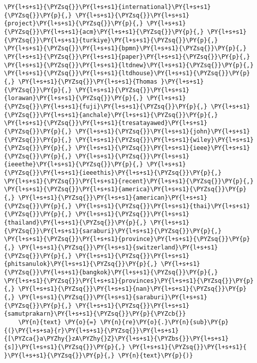 \documentclass[../main.tex]{subfiles}
\begin{document}
\begin{tcolorbox}[breakable, size=fbox, boxrule=1pt, pad at break*=1mm,colback=cellbackground, colframe=cellborder]
\begin{Verbatim}[commandchars=\\\{\}]
          \PY{l+s+s1}{\PYZsq{}}\PY{l+s+s1}{international}\PY{l+s+s1}{\PYZsq{}}\PY{p}{,} \PY{l+s+s1}{\PYZsq{}}\PY{l+s+s1}{project}\PY{l+s+s1}{\PYZsq{}}\PY{p}{,} \PY{l+s+s1}{\PYZsq{}}\PY{l+s+s1}{acm}\PY{l+s+s1}{\PYZsq{}}\PY{p}{,} \PY{l+s+s1}{\PYZsq{}}\PY{l+s+s1}{turkiye}\PY{l+s+s1}{\PYZsq{}}\PY{p}{,}  \PY{l+s+s1}{\PYZsq{}}\PY{l+s+s1}{bpmn}\PY{l+s+s1}{\PYZsq{}}\PY{p}{,} \PY{l+s+s1}{\PYZsq{}}\PY{l+s+s1}{paper}\PY{l+s+s1}{\PYZsq{}}\PY{p}{,} \PY{l+s+s1}{\PYZsq{}}\PY{l+s+s1}{ltdnew}\PY{l+s+s1}{\PYZsq{}}\PY{p}{,} \PY{l+s+s1}{\PYZsq{}}\PY{l+s+s1}{ltdhouse}\PY{l+s+s1}{\PYZsq{}}\PY{p}{,} \PY{l+s+s1}{\PYZsq{}}\PY{l+s+s1}{Thomas }\PY{l+s+s1}{\PYZsq{}}\PY{p}{,} \PY{l+s+s1}{\PYZsq{}}\PY{l+s+s1}{lorawan}\PY{l+s+s1}{\PYZsq{}}\PY{p}{,} \PY{l+s+s1}{\PYZsq{}}\PY{l+s+s1}{fuji}\PY{l+s+s1}{\PYZsq{}}\PY{p}{,} \PY{l+s+s1}{\PYZsq{}}\PY{l+s+s1}{anchale}\PY{l+s+s1}{\PYZsq{}}\PY{p}{,} \PY{l+s+s1}{\PYZsq{}}\PY{l+s+s1}{tresatayawed}\PY{l+s+s1}{\PYZsq{}}\PY{p}{,} \PY{l+s+s1}{\PYZsq{}}\PY{l+s+s1}{john}\PY{l+s+s1}{\PYZsq{}}\PY{p}{,} \PY{l+s+s1}{\PYZsq{}}\PY{l+s+s1}{wiley}\PY{l+s+s1}{\PYZsq{}}\PY{p}{,} \PY{l+s+s1}{\PYZsq{}}\PY{l+s+s1}{ieee}\PY{l+s+s1}{\PYZsq{}}\PY{p}{,} \PY{l+s+s1}{\PYZsq{}}\PY{l+s+s1}{ieeethe}\PY{l+s+s1}{\PYZsq{}}\PY{p}{,} \PY{l+s+s1}{\PYZsq{}}\PY{l+s+s1}{ieeethis}\PY{l+s+s1}{\PYZsq{}}\PY{p}{,} \PY{l+s+s1}{\PYZsq{}}\PY{l+s+s1}{recent}\PY{l+s+s1}{\PYZsq{}}\PY{p}{,} \PY{l+s+s1}{\PYZsq{}}\PY{l+s+s1}{america}\PY{l+s+s1}{\PYZsq{}}\PY{p}{,} \PY{l+s+s1}{\PYZsq{}}\PY{l+s+s1}{american}\PY{l+s+s1}{\PYZsq{}}\PY{p}{,} \PY{l+s+s1}{\PYZsq{}}\PY{l+s+s1}{thai}\PY{l+s+s1}{\PYZsq{}}\PY{p}{,} \PY{l+s+s1}{\PYZsq{}}\PY{l+s+s1}{thailand}\PY{l+s+s1}{\PYZsq{}}\PY{p}{,} \PY{l+s+s1}{\PYZsq{}}\PY{l+s+s1}{saraburi}\PY{l+s+s1}{\PYZsq{}}\PY{p}{,} \PY{l+s+s1}{\PYZsq{}}\PY{l+s+s1}{province}\PY{l+s+s1}{\PYZsq{}}\PY{p}{,} \PY{l+s+s1}{\PYZsq{}}\PY{l+s+s1}{switzerland}\PY{l+s+s1}{\PYZsq{}}\PY{p}{,} \PY{l+s+s1}{\PYZsq{}}\PY{l+s+s1}{phitsanulok}\PY{l+s+s1}{\PYZsq{}}\PY{p}{,} \PY{l+s+s1}{\PYZsq{}}\PY{l+s+s1}{bangkok}\PY{l+s+s1}{\PYZsq{}}\PY{p}{,} \PY{l+s+s1}{\PYZsq{}}\PY{l+s+s1}{provinces}\PY{l+s+s1}{\PYZsq{}}\PY{p}{,} \PY{l+s+s1}{\PYZsq{}}\PY{l+s+s1}{nan}\PY{l+s+s1}{\PYZsq{}}\PY{p}{,} \PY{l+s+s1}{\PYZsq{}}\PY{l+s+s1}{saraburi}\PY{l+s+s1}{\PYZsq{}}\PY{p}{,} \PY{l+s+s1}{\PYZsq{}}\PY{l+s+s1}{samutprakarn}\PY{l+s+s1}{\PYZsq{}}\PY{p}{\PYZcb{}}
    \PY{n}{text} \PY{o}{=} \PY{n}{re}\PY{o}{.}\PY{n}{sub}\PY{p}{(}\PY{l+s+sa}{r}\PY{l+s+s1}{\PYZsq{}}\PY{l+s+s1}{[\PYZca{}a\PYZhy{}zA\PYZhy{}Z}\PY{l+s+s1}{\PYZbs{}}\PY{l+s+s1}{s]}\PY{l+s+s1}{\PYZsq{}}\PY{p}{,} \PY{l+s+s1}{\PYZsq{}}\PY{l+s+s1}{ }\PY{l+s+s1}{\PYZsq{}}\PY{p}{,} \PY{n}{text}\PY{p}{)}

\end{Verbatim}
\end{tcolorbox}
\end{document}
